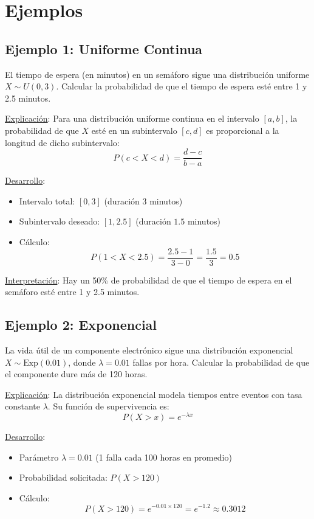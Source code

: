 \documentclass[letterpaper]{article}
\begin{document}
	\section{Ejemplos}
	
	\subsection{Ejemplo 1: Uniforme Continua}
	El tiempo de espera (en minutos) en un semáforo sigue una distribución uniforme $X \sim U(0, 3)$. Calcular la probabilidad de que el tiempo de espera esté entre 1 y 2.5 minutos.
	
	\underline{Explicación}:
	Para una distribución uniforme continua en el intervalo $[a, b]$, la probabilidad de que $X$ esté en un subintervalo $[c, d]$ es proporcional a la longitud de dicho subintervalo:
	\[ P(c < X < d) = \frac{d - c}{b - a} \]
	
	\underline{Desarrollo}:
	\begin{itemize}
		\item Intervalo total: $[0, 3]$ (duración $3$ minutos)
		\item Subintervalo deseado: $[1, 2.5]$ (duración $1.5$ minutos)
		\item Cálculo: 
		\[ P(1 < X < 2.5) = \frac{2.5 - 1}{3 - 0} = \frac{1.5}{3} = 0.5 \]
	\end{itemize}
	
	\underline{Interpretación}: Hay un 50\% de probabilidad de que el tiempo de espera en el semáforo esté entre 1 y 2.5 minutos.
	
	\subsection{Ejemplo 2: Exponencial}
	La vida útil de un componente electrónico sigue una distribución exponencial $X \sim \text{Exp}(0.01)$, donde $\lambda = 0.01$ fallas por hora. Calcular la probabilidad de que el componente dure más de 120 horas.
	
	\underline{Explicación}:
	La distribución exponencial modela tiempos entre eventos con tasa constante $\lambda$. Su función de supervivencia es:
	\[ P(X > x) = e^{-\lambda x} \]
	
	\underline{Desarrollo}:
	\begin{itemize}
		\item Parámetro $\lambda = 0.01$ (1 falla cada 100 horas en promedio)
		\item Probabilidad solicitada: $P(X > 120)$
		\item Cálculo:
		\[ P(X > 120) = e^{-0.01 \times 120} = e^{-1.2} \approx 0.3012 \]
	\end{itemize}
	
\end{document}
